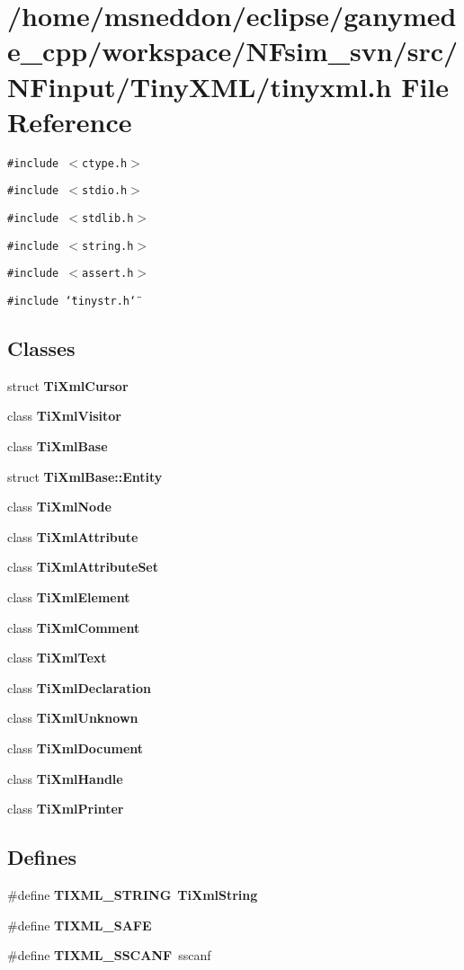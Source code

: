 \section{/home/msneddon/eclipse/ganymede\_\-cpp/workspace/NFsim\_\-svn/src/NFinput/TinyXML/tinyxml.h File Reference}
\label{tinyxml_8h}


{\tt \#include $<$ctype.h$>$}\par
{\tt \#include $<$stdio.h$>$}\par
{\tt \#include $<$stdlib.h$>$}\par
{\tt \#include $<$string.h$>$}\par
{\tt \#include $<$assert.h$>$}\par
{\tt \#include \char`\"{}tinystr.h\char`\"{}}\par
\subsection*{Classes}
\begin{CompactItemize}
\item 
struct {\bf TiXmlCursor}
\item 
class {\bf TiXmlVisitor}
\item 
class {\bf TiXmlBase}
\item 
struct \textbf{TiXmlBase::Entity}
\item 
class {\bf TiXmlNode}
\item 
class {\bf TiXmlAttribute}
\item 
class {\bf TiXmlAttributeSet}
\item 
class {\bf TiXmlElement}
\item 
class {\bf TiXmlComment}
\item 
class {\bf TiXmlText}
\item 
class {\bf TiXmlDeclaration}
\item 
class {\bf TiXmlUnknown}
\item 
class {\bf TiXmlDocument}
\item 
class {\bf TiXmlHandle}
\item 
class {\bf TiXmlPrinter}
\end{CompactItemize}
\subsection*{Defines}
\begin{CompactItemize}
\item 
\#define {\bf TIXML\_\-STRING}~{\bf TiXmlString}
\item 
\#define {\bf TIXML\_\-SAFE}
\item 
\#define {\bf TIXML\_\-SSCANF}~sscanf
\end{CompactItemize}

